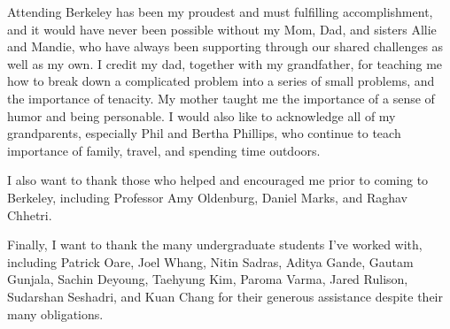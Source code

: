 \documentclass{ucbthesis}
\begin{document}
\begin{frontmatter}
\begin{acknowledgements}
Attending Berkeley has been my proudest and must fulfilling accomplishment, and it would have never been possible without my Mom, Dad, and sisters Allie and Mandie, who have always been supporting through our shared challenges as well as my own. I credit my dad, together with my grandfather, for teaching me how to break down a complicated problem into a series of small problems, and the importance of tenacity. My mother taught me the importance of a sense of humor and being personable. I would also like to acknowledge all of my grandparents, especially Phil and Bertha Phillips, who continue to teach importance of family, travel, and spending time outdoors.

I also want to thank those who helped and encouraged me prior to coming to Berkeley, including Professor Amy Oldenburg, Daniel Marks, and Raghav Chhetri.

Finally, I want to thank the many undergraduate students I've worked with, including Patrick Oare, Joel Whang, Nitin Sadras, Aditya Gande, Gautam Gunjala, Sachin Deyoung, Taehyung Kim, Paroma Varma, Jared Rulison, Sudarshan Seshadri, and Kuan Chang for their generous assistance despite their many obligations.

\end{acknowledgements}

\end{frontmatter}
\pagestyle{headings}

% 
% 
% 
% 
% 
% 


\end{document}
